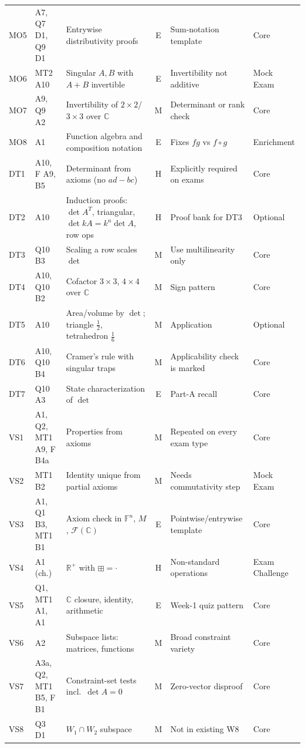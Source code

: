 {\begin{longtable}{@{}l p{2.6cm} p{5.2cm} c p{3.9cm} p{1.7cm}@{}}
MO5 & A7, Q7 D1, Q9 D1 & Entrywise distributivity proofs & E & Sum-notation template & Core\\
MO6 & MT2 A10 & Singular $A,B$ with $A+B$ invertible & E & Invertibility not additive & Mock Exam\\
MO7 & A9, Q9 A2 & Invertibility of $2\times2$/$3\times3$ over $\mathbb C$ & M & Determinant or rank check & Core\\
MO8 & A1 & Function algebra and composition notation & E & Fixes $fg$ vs $f\circ g$ & Enrichment\\
DT1 & A10, F A9, B5 & Determinant from axioms (no $ad-bc$) & H & Explicitly required on exams & Core\\
DT2 & A10 & Induction proofs: $\det A^T$, triangular, $\det kA=k^n\det A$, row ops & H & Proof bank for DT3 & Optional\\
DT3 & Q10 B3 & Scaling a row scales $\det$ & M & Use multilinearity only & Core\\
DT4 & A10, Q10 B2 & Cofactor $3\times3$, $4\times4$ over $\mathbb C$ & M & Sign pattern & Core\\
DT5 & A10 & Area/volume by $\det$; triangle $\tfrac12$, tetrahedron $\tfrac16$ & M & Application & Optional\\
DT6 & A10, Q10 B4 & Cramer's rule with singular traps & M & Applicability check is marked & Core\\
DT7 & Q10 A3 & State characterization of $\det$ & E & Part-A recall & Core\\
VS1 & A1, Q2, MT1 A9, F B4a & Properties from axioms & M & Repeated on every exam type & Core\\
VS2 & MT1 B2 & Identity unique from partial axioms & M & Needs commutativity step & Mock Exam\\
VS3 & A1, Q1 B3, MT1 B1 & Axiom check in $\mathbb F^n$, $M$, $\mathcal F(\mathbb C)$ & E & Pointwise/entrywise template & Core\\
VS4 & A1 (ch.) & $\mathbb R^+$ with $\boxplus=\cdot$ & H & Non-standard operations & Exam Challenge\\
VS5 & Q1, MT1 A1, A1 & $\mathbb C$ closure, identity, arithmetic & E & Week-1 quiz pattern & Core\\
VS6 & A2 & Subspace lists: matrices, functions & M & Broad constraint variety & Core\\
VS7 & A3a, Q2, MT1 B5, F B1 & Constraint-set tests incl.\ $\det A=0$ & M & Zero-vector disproof & Core\\
VS8 & Q3 D1 & $W_1\cap W_2$ subspace & M & Not in existing W8 & Core\\

\end{longtable}}
